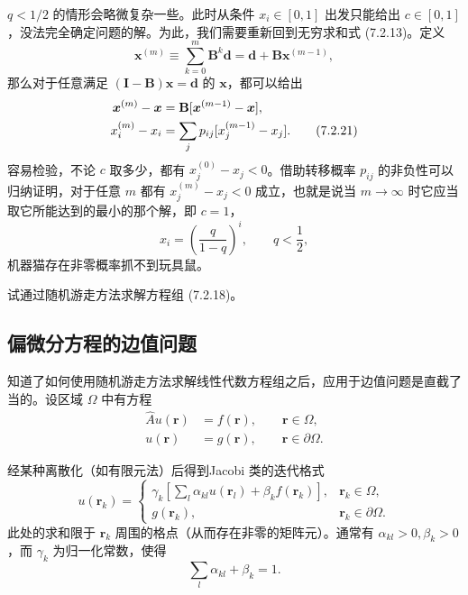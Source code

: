 $q<1/2$ 的情形会略微复杂一些。此时从条件 $x_i\in[0,1]$ 出发只能给出 $c\in[0,1]$，没法完全确定问题的解。为此，我们需要重新回到无穷求和式 (7.2.13)。定义
\begin{equation}
 \bm x^{(m)}\equiv\sum_{k=0}^{m}\mathbf B^k\bm d
 =\bm d+\mathbf B\bm x^{(m-1)},
\tag{7.2.20}
\end{equation}
那么对于任意满足 $(\mathbf I-\mathbf B)\bm x=\bm d$ 的 $\bm x$，都可以给出
\begin{align}
 \bm x^{(m)}-\bm x&=\mathbf B[\bm x^{(m-1)}-\bm x],\notag\\
 x_i^{(m)}-x_i&=\sum_j p_{ij}[x_j^{(m-1)}-x_j].
\tag{7.2.21}
\end{align}
容易检验，不论 $c$ 取多少，都有 $x_j^{(0)}-x_j<0$。借助转移概率 $p_{ij}$ 的非负性可以归纳证明，对于任意 $m$ 都有 $x_j^{(m)}-x_j<0$ 成立，也就是说当 $m\to\infty$ 时它应当取它所能达到的最小的那个解，即 $c=1$，
\[
 x_i=\left(\frac{q}{1-q}\right)^i,\qquad q<\frac12,
\]
机器猫存在非零概率抓不到玩具鼠。

\begin{exerciseBox}[练习 7.3]
试通过随机游走方法求解方程组 (7.2.18)。
\end{exerciseBox}

\subsection{偏微分方程的边值问题}

知道了如何使用随机游走方法求解线性代数方程组之后，应用于边值问题是直截了当的。设区域 $\Omega$ 中有方程
\begin{equation}
\begin{aligned}
 \hat A u(\bm r)&=f(\bm r),\qquad \bm r\in\Omega,\\
 u(\bm r)&=g(\bm r),\qquad \bm r\in\partial\Omega.
\end{aligned}
\tag{7.2.22}
\end{equation}

经某种离散化（如有限元法）后得到Jacobi 类的迭代格式
\begin{equation}
 u(\bm r_k)=
 \begin{cases}
 \gamma_k\left[\displaystyle\sum_l\alpha_{kl}u(\bm r_l)+\beta_k f(\bm r_k)\right],&\bm r_k\in\Omega,\\[3pt]
 g(\bm r_k),&\bm r_k\in\partial\Omega.
 \end{cases}
\tag{7.2.23}
\end{equation}
此处的求和限于 $\bm r_k$ 周围的格点（从而存在非零的矩阵元）。通常有 $\alpha_{kl}>0,\beta_k>0$，而 $\gamma_k$ 为归一化常数，使得
\begin{equation}
 \sum_l\alpha_{kl}+\beta_k=1.
\tag{7.2.24}
\end{equation}


